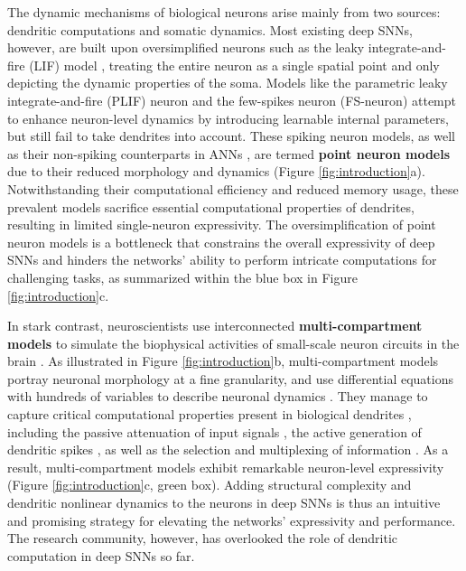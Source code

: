 The dynamic mechanisms of biological neurons arise mainly from two sources: dendritic computations and somatic dynamics. Most existing deep SNNs, however, are built upon oversimplified neurons such as the leaky integrate-and-fire (LIF) model \cite{lapicque1907lif}, treating the entire neuron as a single spatial point and only depicting the dynamic properties of the soma. Models like the parametric leaky integrate-and-fire (PLIF) neuron \cite{fang2020plif} and the few-spikes neuron (FS-neuron) \cite{stockl2021optimized} attempt to enhance neuron-level dynamics by introducing learnable internal parameters, but still fail to take dendrites into account. These spiking neuron models, as well as their non-spiking counterparts in ANNs \cite{sanger1958perceptron}, are termed \textbf{point neuron models} due to their reduced morphology and dynamics (Figure \ref{fig:introduction}a). Notwithstanding their computational efficiency and reduced memory usage, these prevalent models sacrifice essential computational properties of dendrites, resulting in limited single-neuron expressivity. The oversimplification of point neuron models is a bottleneck that constrains the overall expressivity of deep SNNs and hinders the networks' ability to perform intricate computations for challenging tasks, as summarized within the blue box in Figure \ref{fig:introduction}c. 

In stark contrast, neuroscientists use interconnected \textbf{multi-compartment models} to simulate the biophysical activities of small-scale neuron circuits in the brain \cite{hines2001NEURON,stimberg2019Brian2}. As illustrated in Figure \ref{fig:introduction}b, multi-compartment models portray neuronal morphology at a fine granularity, and use differential equations with hundreds of variables to describe neuronal dynamics \cite{poirazi2003arithmetic,schutter1994purkinje,hay2011pyramidal}. They manage to capture critical computational properties present in biological dendrites \cite{london2005dendritic,payeur2019dendriticinfo,acharya2022dendritic}, including the passive attenuation of input signals \cite{mengual2020dendsoma}, the active generation of dendritic spikes \cite{major2013active}, as well as the selection and multiplexing of information \cite{payeur2019dendriticinfo}. As a result, multi-compartment models exhibit remarkable neuron-level expressivity (Figure \ref{fig:introduction}c, green box). Adding structural complexity and dendritic nonlinear dynamics to the neurons in deep SNNs is thus an intuitive and promising strategy for elevating the networks' expressivity and performance. The research community, however, has overlooked the role of dendritic computation in deep SNNs so far.

